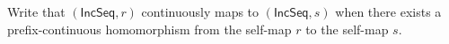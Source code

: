 \begin{definition}
Write that $(\mathsf{IncSeq},r)$ continuously maps to
$(\mathsf{IncSeq},s)$ when there exists a prefix-continuous homomorphism from
the self-map $r$ to the self-map $s$.
\end{definition}

